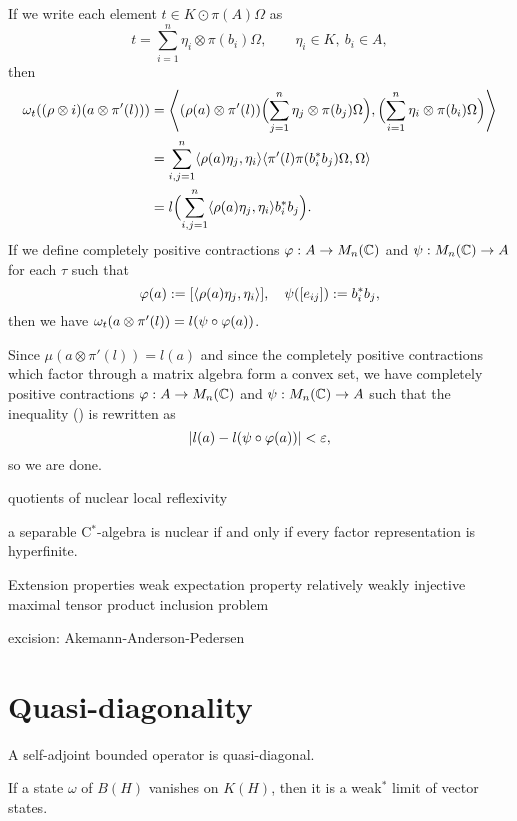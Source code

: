 \documentclass{../../large}
\begin{document}
\begin{pf}
If we write each element $t\in K\odot\pi(A)\Omega$ as
\[t=\sum_{i=1}^n\eta_i\otimes\pi(b_i)\Omega,\qquad\eta_i\in K,\ b_i\in A,\]
then
\begin{align*}
\omega_t((\rho\otimes i)(a\otimes\pi'(l)))
&=\left\langle(\rho(a)\otimes\pi'(l))\Bigl(\sum_{j=1}^n\eta_j\otimes\pi(b_j)\Omega\Bigr),\Bigl(\sum_{i=1}^n\eta_i\otimes\pi(b_i)\Omega\Bigr)\right\rangle\\
&=\sum_{i,j=1}^n\langle\rho(a)\eta_j,\eta_i\rangle\langle\pi'(l)\pi(b_i^*b_j)\Omega,\Omega\rangle\\
&=l\Bigl(\sum_{i,j=1}^n\langle\rho(a)\eta_j,\eta_i\rangle b_i^*b_j\Bigr).
\end{align*}
If we define completely positive contractions $\varphi:A\to M_n(\mathbb{C})$ and $\psi:M_n(\mathbb{C})\to A$ for each $\tau$ such that
\[\varphi(a):=[\langle\rho(a)\eta_j,\eta_i\rangle],\quad\psi([e_{ij}]):=b_i^*b_j,\]
then we have $\omega_t(a\otimes\pi'(l))=l(\psi\circ\varphi(a))$.

Since $\mu(a\otimes\pi'(l))=l(a)$ and since the completely positive contractions which factor through a matrix algebra form a convex set, we have completely positive contractions $\varphi:A\to M_n(\mathbb{C})$ and $\psi:M_n(\mathbb{C})\to A$ such that the inequality (\dagger) is rewritten as
\[|l(a)-l(\psi\circ\varphi(a))|<\varepsilon,\]
so we are done.
\end{pf}





quotients of nuclear
local reflexivity


a separable C$^*$-algebra is nuclear if and only if every factor representation is hyperfinite.

Extension properties
weak expectation property
relatively weakly injective
maximal tensor product inclusion problem



excision: Akemann-Anderson-Pedersen

\section{Quasi-diagonality}

\begin{prb}
A self-adjoint bounded operator is quasi-diagonal.
\end{prb}

\begin{prb}
If a state $\omega$ of $B(H)$ vanishes on $K(H)$, then it is a weak$^*$ limit of vector states.
\end{prb}
\end{document}
